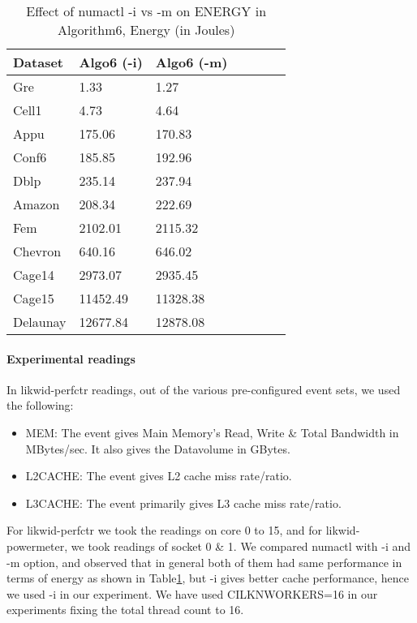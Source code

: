 \begin{table}[th]
\begin{center}
    \begin{tabular}{| l | l | l | l | l | l | l |}
    \hline
	Dataset &  Algo6 (-i) & Algo6 (-m)\\ \hline
    \hline
	Gre & 1.33 &  \cellcolor{green!25}1.27\\ \hline
	Cell1 & 4.73 & \cellcolor{green!25}4.64\\ \hline
	Appu & 175.06 & \cellcolor{green!25}170.83\\ \hline
	Conf6 & \cellcolor{green!25}185.85 & 192.96 \\ \hline
	Dblp & \cellcolor{green!25}235.14 & 237.94\\ \hline
	Amazon & \cellcolor{green!25}208.34 & 222.69\\ \hline
	Fem & \cellcolor{green!25}2102.01 & 2115.32\\ \hline
	Chevron & \cellcolor{green!25}640.16 & 646.02\\ \hline
	Cage14 & 2973.07 & \cellcolor{green!25}2935.45\\ \hline
	Cage15 & 11452.49 & \cellcolor{green!25}11328.38\\ \hline
	Delaunay & \cellcolor{green!25}12677.84 & 12878.08\\ \hline
    \end{tabular}
\end{center}
\caption{\capfont Effect of numactl -i vs -m on ENERGY in Algorithm6,
Energy (in Joules)}
\label{tab:Table7}
\end{table}


\paragraph{Experimental readings}
In likwid-perfctr readings, out of the various pre-configured event
sets, we used the following:
\begin{itemize}[leftmargin=*]
\item MEM: The event gives Main Memory's Read, Write \& Total 
Bandwidth in MBytes/sec. It also gives the Datavolume in GBytes.
\item L2CACHE: The event gives L2 cache miss rate/ratio.
\item L3CACHE: The event primarily gives L3 cache miss rate/ratio.
\end{itemize}
For likwid-perfctr we took the readings on core 0 to 15, and for
likwid-powermeter, we took readings of socket 0 \& 1.\newline 
We compared numactl with -i and -m option, and observed that in
general both of them had same performance in terms of energy as shown
in Table\ref{tab:Table7}, but -i gives better cache performance, hence
we used -i in our experiment.  We have used CILKNWORKERS=16 in our
experiments fixing the total thread count to 16.

